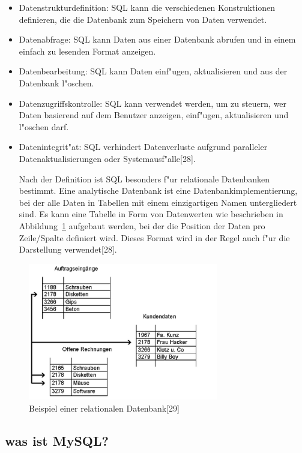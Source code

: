 \begin{itemize}
\item Datenstrukturdefinition: SQL kann die verschiedenen Konstruktionen 
definieren, die die Datenbank zum Speichern von Daten verwendet.
\item Datenabfrage: SQL kann Daten aus einer Datenbank abrufen 
und in einem einfach zu lesenden Format anzeigen.
\item Datenbearbeitung: SQL kann Daten einf"ugen, 
aktualisieren und aus der Datenbank l"oschen.
\item Datenzugriffskontrolle: SQL kann verwendet werden, um zu steuern,
 wer Daten basierend auf dem Benutzer anzeigen, einf"ugen, 
 aktualisieren und l"oschen darf.
 \item Datenintegrit"at: SQL verhindert Datenverluste aufgrund paralleler 
 Datenaktualisierungen oder Systemausf"alle[28].
 



Nach der Definition ist SQL besonders f"ur relationale Datenbanken bestimmt. 
Eine analytische Datenbank ist eine Datenbankimplementierung, 
bei der alle Daten in Tabellen mit einem einzigartigen Namen 
untergliedert sind. Es kann eine Tabelle in Form von Datenwerten wie beschrieben in Abbildung~\ref{fig:Daten}
aufgebaut werden, bei der die Position der Daten pro Zeile/Spalte 
definiert wird. Dieses Format wird in der Regel 
auch f"ur die Darstellung verwendet[28].
 

 \end{itemize}
 \begin{figure}[!htb]
\begin{center}
\includegraphics[height=6cm]{bilder/Daten.eps}
\end{center}
\caption{Beispiel einer relationalen Datenbank[29]}\label{fig:Daten}
\end{figure}




\subsection{was ist MySQL?}

